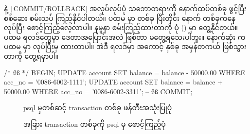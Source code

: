  နဲ့ \texttt|COMMIT/ROLLBACK| အလုပ်လုပ်ပုံ သဘောတရားကို  နောက်ထပ်တစ်ခု ဖွင့်ပြီး စစ်ဆေး စမ်းသပ် ကြည့်နိုင်ပါတယ်။ ပထမ  မှာ  တစ်ခု  ပြီးတိုင်း နောက်  တစ်ခုကနေ  လုပ်ပြီး စောင့်ကြည့်လေ့လာပါ။ နမူနာ စမ်းကြည့်ထားတာကို ပုံ (\fRefNo{\ref{fig:txchk}}) မှာ တွေ့နိုင်တယ်။ ပထမ  ရလဒ်တွေမှာ ဒေတာအပြောင်းအလဲ ဖြစ်တာ မတွေ့ရသေးပါဘူး။ နောက်ဆုံး  က ပထမ  မှာ  လုပ်ပြီးမှ  ထားတာပါ။ အဲဒီ ရလဒ်မှာ အကောင့်  နှစ်ခု အမှန်တကယ်  ဖြစ်သွားတာကို တွေ့ရမှာပါ။ 

%
\begin{sql}
/* ßß */
BEGIN;
UPDATE account SET balance = balance - 50000.00 
    WHERE acc_no = '0086-6002-1111';
UPDATE account SET balance = balance + 50000.00 
    WHERE acc_no = '0086-6002-3311';
-- ßß
COMMIT;
\end{sql}
%

\begin{figure}[tbh!]
\caption{psql မှတစ်ဆင့် transaction တစ်ခု ဖန်တီးအသုံးပြုပုံ} 
\label{fig:tx}
\end{figure}


\begin{figure}[!htb]
\caption{အခြား transaction တစ်ခုကို psql မှ စောင့်ကြည့်ပုံ}
\label{fig:txchk}
\end{figure}

